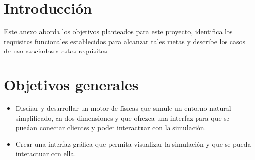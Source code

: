 
\section{Introducción}
Este anexo aborda los objetivos planteados para este proyecto, identifica los requisitos funcionales establecidos para alcanzar tales metas y describe los casos de uso asociados a estos requisitos.
\section{Objetivos generales}
\begin{itemize}
    \item Diseñar y desarrollar un motor de físicas que simule un entorno natural simplificado, en dos dimensiones y que ofrezca una interfaz para que se puedan conectar clientes  y poder interactuar con la simulación.
    \item Crear una interfaz gráfica que permita visualizar la simulación y que se pueda interactuar con ella.
\end{itemize}
